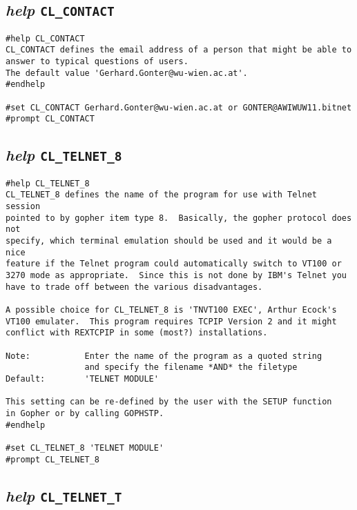 \subsection{{\sl{help}} {\tt CL\_CONTACT}}

\def\LPtopD{{\sl{help}} {\tt CL\_CONTACT}}

\def\LPtopF{~}

\begin{verbatim}
#help CL_CONTACT
CL_CONTACT defines the email address of a person that might be able to
answer to typical questions of users.
The default value 'Gerhard.Gonter@wu-wien.ac.at'.
#endhelp

#set CL_CONTACT Gerhard.Gonter@wu-wien.ac.at or GONTER@AWIWUW11.bitnet
#prompt CL_CONTACT
\end{verbatim}

\subsection{{\sl{help}} {\tt CL\_TELNET\_8}}

\def\LPtopD{{\sl{help}} {\tt CL\_TELNET\_8}}

\def\LPtopF{~}

\begin{verbatim}
#help CL_TELNET_8
CL_TELNET_8 defines the name of the program for use with Telnet session
pointed to by gopher item type 8.  Basically, the gopher protocol does not
specify, which terminal emulation should be used and it would be a nice
feature if the Telnet program could automatically switch to VT100 or
3270 mode as appropriate.  Since this is not done by IBM's Telnet you
have to trade off between the various disadvantages.

A possible choice for CL_TELNET_8 is 'TNVT100 EXEC', Arthur Ecock's
VT100 emulater.  This program requires TCPIP Version 2 and it might
conflict with REXTCPIP in some (most?) installations.

Note:           Enter the name of the program as a quoted string
                and specify the filename *AND* the filetype
Default:        'TELNET MODULE'

This setting can be re-defined by the user with the SETUP function
in Gopher or by calling GOPHSTP.
#endhelp

#set CL_TELNET_8 'TELNET MODULE'
#prompt CL_TELNET_8
\end{verbatim}

\subsection{{\sl{help}} {\tt CL\_TELNET\_T}}


